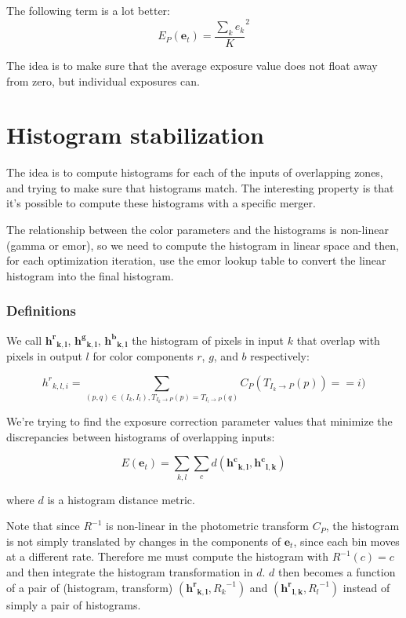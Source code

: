 \documentclass{article}
\begin{document}
The following term is a lot better:
\begin{equation}
  E_P(\mathbf{e}_t) = {\frac{\sum_k{e_k}}{K}}^2
\end{equation}

The idea is to make sure that the average exposure value does not float away from zero, but individual exposures can.

\part {Histogram stabilization}

The idea is to compute histograms for each of the inputs of overlapping zones, and trying to make sure that histograms match.
The interesting property is that it's possible to compute these histograms with a specific merger.

The relationship between the color parameters and the histograms is non-linear (gamma or emor), so we need to compute the histogram in linear space and then,
for each optimization iteration, use the emor lookup table to convert the linear histogram into the final histogram.

\section{Definitions}

We call $\mathbf{{h^r}_{k,l}}$, $\mathbf{{h^g}_{k,l}}$, $\mathbf{{h^b}_{k,l}}$ the histogram of pixels in input $k$ that
overlap with pixels in output $l$ for color components $r$, $g$, and $b$ respectively:

\begin{equation}
  {h^r}_{k,l,i} = \sum_{(p, q) \in (I_k, I_l), T_{I_k \rightarrow P}(p) = T_{I_l \rightarrow P}(q)}{C_P(T_{I_k \rightarrow P}(p)) == i)}
\end{equation}

We're trying to find the exposure correction parameter values that minimize the discrepancies between histograms of overlapping inputs:

\begin{equation}
  E(\mathbf{e}_t) = \sum_{k,l}{\sum_c{d(\mathbf{{h^c}_{k,l}}, \mathbf{{h^c}_{l,k}})}}
\end{equation}

where $d$ is a histogram distance metric.

Note that since $R^{-1}$ is non-linear in the photometric transform $C_P$, the histogram is not simply translated by changes in the components of $\mathbf{e}_t$,
since each bin moves at a different rate. Therefore me must compute the histogram with $R^{-1}(c) = c$ and then integrate the histogram transformation in $d$.
$d$ then becomes a function of a pair of (histogram, transform) $(\mathbf{{h^r}_{k,l}}, {R_k}^{-1})$ and $(\mathbf{{h^r}_{l,k}}, {R_l}^{-1})$ instead of simply a pair of histograms.
\end{document}
